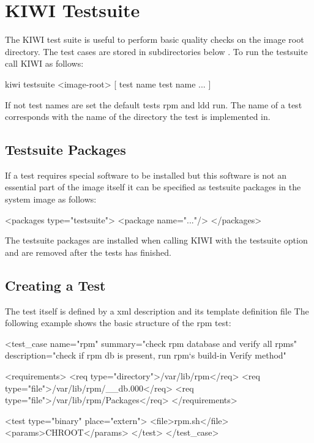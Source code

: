 \chapter{KIWI Testsuite}
\label{chapter:testing}
\minitoc

The KIWI test suite is useful to perform basic quality checks on
the image root directory. The test cases are stored in subdirectories
below . To run the testsuite call KIWI as
follows:

\begin{Command}{12cm}
kiwi testsuite <image-root> [ test name test name ... ]
\end{Command}

If not test names are set the default tests rpm and ldd run.
The name of a test corresponds with the name of the directory
the test is implemented in.

\section{Testsuite Packages}
If a test requires special software to be installed but this
software is not an essential part of the image itself it can be
specified as testsuite packages in the system image 
as follows:

\begin{xml}
<packages type="testsuite">
  <package name="..."/>
</packages>
\end{xml}

The testsuite packages are installed when calling KIWI with
the testsuite option and are removed after the tests has
finished.

\section{Creating a Test}
The test itself is defined by a xml description 
and its template definition file 
The following example shows the basic structure of the rpm test:

\begin{xml}
<test_case
  name="rpm"
  summary="check rpm database and verify all rpms"
  description="check if rpm db is present, run rpm`s build-in Verify method"

  <requirements>
     <req type="directory">/var/lib/rpm</req>
     <req type="file">/var/lib/rpm/__db.000</req>
     <req type="file">/var/lib/rpm/Packages</req>
  </requirements>

  <test type="binary"  place="extern">
     <file>rpm.sh</file>
     <params>CHROOT</params>
  </test>
</test_case>
\end{xml}

